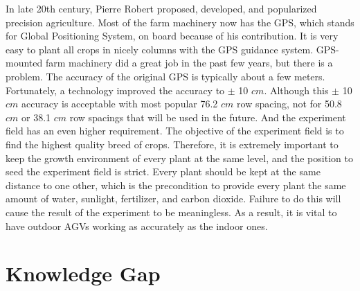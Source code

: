 In late 20th century, Pierre Robert proposed, developed, and popularized precision agriculture. \cite{mcbratney2005future} Most of the farm machinery now has the GPS, which stands for Global Positioning System, on board because of his contribution. It is very easy to plant all crops in nicely columns with the GPS guidance system. GPS-mounted farm machinery did a great job in the past few years, but there is a problem. The accuracy of the original GPS is typically about a few meters. Fortunately, a technology improved the accuracy to $\pm$ 10 $cm$. \cite{thuilot2002automatic} Although this $\pm$ 10 $cm$ accuracy is acceptable with most popular 76.2 $cm$ row spacing, not for 50.8 $cm$ or 38.1 $cm$ row spacings that will be used in the future. \cite{fawcett2014farm} And the experiment field has an even higher requirement. The objective of the experiment field is to find the highest quality breed of crops. Therefore, it is extremely important to keep the growth environment of every plant at the same level, and the position to seed the experiment field is strict. Every plant should be kept at the same distance to one other, which is the precondition to provide every plant the same amount of water, sunlight, fertilizer, and carbon dioxide. Failure to do this will cause the result of the experiment to be meaningless. As a result, it is vital to have outdoor AGVs working as accurately as the indoor ones.

\section{Knowledge Gap}

